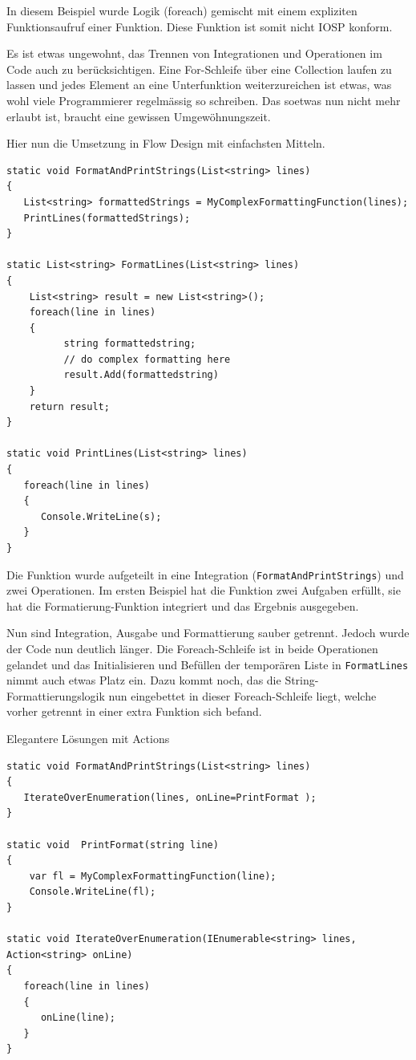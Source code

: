\documentclass[11pt]{article}
\begin{document}
In diesem Beispiel wurde Logik (foreach) gemischt mit einem expliziten Funktionsaufruf einer Funktion.
Diese Funktion ist somit nicht IOSP konform.

Es ist etwas ungewohnt, das Trennen von Integrationen und Operationen im Code auch zu berücksichtigen.
Eine For-Schleife über eine Collection laufen zu lassen und jedes Element an eine Unterfunktion weiterzureichen ist etwas,
was wohl viele Programmierer regelmässig so schreiben.
Das soetwas nun nicht mehr erlaubt ist, braucht eine gewissen Umgewöhnungszeit.


Hier nun die Umsetzung in Flow Design mit einfachsten Mitteln.



\begin{verbatim}
static void FormatAndPrintStrings(List<string> lines)
{
   List<string> formattedStrings = MyComplexFormattingFunction(lines);
   PrintLines(formattedStrings);
}

static List<string> FormatLines(List<string> lines)
{
    List<string> result = new List<string>();
    foreach(line in lines)
    {
          string formattedstring;
          // do complex formatting here
          result.Add(formattedstring) 
    }
    return result;
}

static void PrintLines(List<string> lines)
{
   foreach(line in lines)
   {
      Console.WriteLine(s);
   }
}
\end{verbatim}

Die Funktion wurde aufgeteilt in eine Integration (\texttt{FormatAndPrintStrings}) und zwei Operationen.
Im ersten Beispiel hat die Funktion zwei Aufgaben erfüllt, sie hat die Formatierung-Funktion integriert und 
das Ergebnis ausgegeben.

Nun sind Integration, Ausgabe und Formattierung sauber getrennt.
Jedoch wurde der Code nun deutlich länger. Die Foreach-Schleife ist in beide Operationen gelandet und das Initialisieren und
Befüllen der temporären Liste in \texttt{FormatLines} nimmt auch etwas Platz ein.
Dazu kommt noch, das die String-Formattierungslogik nun eingebettet in dieser Foreach-Schleife liegt, welche vorher getrennt in
einer extra Funktion sich befand. 

Elegantere Lösungen mit Actions

\begin{verbatim}
static void FormatAndPrintStrings(List<string> lines)
{
   IterateOverEnumeration(lines, onLine=PrintFormat );
}

static void  PrintFormat(string line)
{
    var fl = MyComplexFormattingFunction(line);
    Console.WriteLine(fl);
}

static void IterateOverEnumeration(IEnumerable<string> lines, Action<string> onLine)
{
   foreach(line in lines)
   {
      onLine(line);
   }
}
\end{verbatim}
\end{document}
